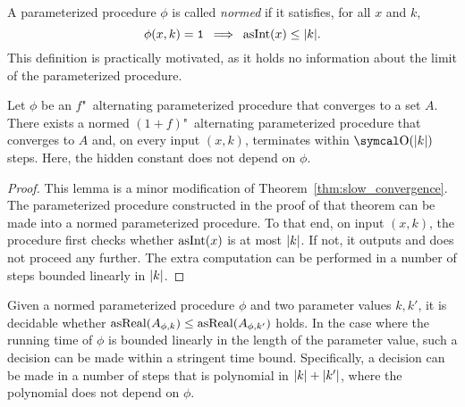 A parameterized procedure $\phi$ is called \emph{normed} \parencite{ambos-spies2000weakly} if it satisfies, for all $x$ and $k$,
\begin{equation*}
  \phi(x, k) = \textnormal{\texttt{1}} \:\implies\: \operatorname{asInt}(x) \le {\lvert k\rvert}.
\end{equation*}
This definition is practically motivated, as it holds no information about the limit of the parameterized procedure.
\begin{lemma}
\label{lem:slow_convergence_normed}%
  Let $\phi$ be an $f$"~alternating parameterized procedure that converges to a set $A$.
  There exists a normed $(1 + f)$"~alternating parameterized procedure that converges to $A$ and, on every input $(x, k)$, terminates within $\bigO(\length{k})$ steps.
  Here, the hidden constant does not depend on $\phi$.
\end{lemma}
\begin{proof}
  This lemma is a minor modification of Theorem~\ref{thm:slow_convergence}.
  The parameterized procedure constructed in the proof of that theorem can be made into a normed parameterized procedure.
  To that end, on input $(x, k)$, the procedure first checks whether $\operatorname{asInt}(x)$ is at most ${\lvert k\rvert}$.
  If not, it outputs  and does not proceed any further.
  The extra computation can be performed in a number of steps bounded linearly in ${\lvert k\rvert}$.
\end{proof}

Given a normed parameterized procedure $\phi$ and two parameter values $k, k'$, it is decidable whether $\operatorname{asReal}(A_{\phi, k}) \le \operatorname{asReal}(A_{\phi, k'})$ holds.
In the case where the running time of $\phi$ is bounded linearly in the length of the parameter value, such a decision can be made within a stringent time bound.
Specifically, a decision can be made in a number of steps that is polynomial in ${\lvert k\rvert} + {\lvert k'\rvert}$, where the polynomial does not depend on $\phi$.


